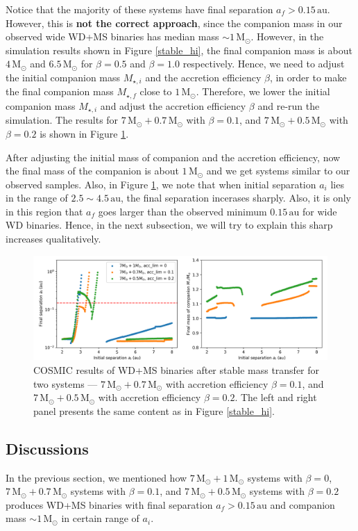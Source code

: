 \documentclass[12pt]{article}
\newcommand{\Msun}{\,\mathrm{M_{\odot}}}
\newcommand{\au}{\, \mathrm{au}}
\begin{document}
Notice that the majority of these systems have final separation $a_f > 0.15 \au$. However, this is \textbf{not the correct approach}, since the companion mass in our observed wide WD+MS binaries has median mass $\sim 1\Msun$. However, in the simulation results shown in Figure \ref{stable_hi}, the final companion mass is about $4 \Msun$ and $6.5 \Msun$ for $\beta = 0.5$ and $\beta = 1.0$ respectively. Hence, we need to adjust the  initial companion mass $M_{\star, i}$ and the accretion efficiency $\beta$, in order to make the final companion mass $M_{\star, f}$ close to $1\Msun$. Therefore, we lower the initial companion mass $M_{\star, i}$ and adjust the accretion efficiency $\beta$ and re-run the simulation. The results for $7\Msun + 0.7\Msun$ with $\beta = 0.1$, and $7\Msun + 0.5\Msun$ with $\beta = 0.2$ is shown in Figure \ref{stable_hi_ex}. 

After adjusting the initial mass of companion and the accretion efficiency, now the final mass of the companion is about $1\Msun$ and we get systems similar to our observed samples. 
Also, in Figure \ref{stable_hi_ex}, we note that when initial separation $a_i$ lies in the range of $2.5 \sim 4.5 \au$, the final separation incerases sharply. Also, it is only in this region that $a_f$ goes larger than the observed minimum $0.15 \au$ for wide WD binaries. Hence, in the next subsection, we will try to explain this sharp increases qualitatively.

\begin{figure}
  \centering
  \includegraphics[width = 0.75\linewidth]{fig/stable7+1ex.png}
  \caption{COSMIC results of WD+MS binaries after stable mass transfer for two systems — $7\Msun + 0.7\Msun$ with accretion efficiency $\beta = 0.1$, and $7\Msun + 0.5\Msun$ with accretion efficiency $\beta = 0.2$. The left and right panel presents the same content as in Figure \ref{stable_hi}.}
  \label{stable_hi_ex}
\end{figure}

\subsection{Discussions}
In the previous section, we mentioned how $7\Msun + 1 \Msun$ systems with $\beta = 0$, $7 \Msun + 0.7\Msun$ systems with $\beta = 0.1$, and $7 \Msun + 0.5 \Msun$ systems with $\beta = 0.2$ produces WD+MS binaries with final separation $a_f > 0.15 \au$ and companion mass $\sim 1 \Msun$ in certain range of $a_i$.
\end{document}
